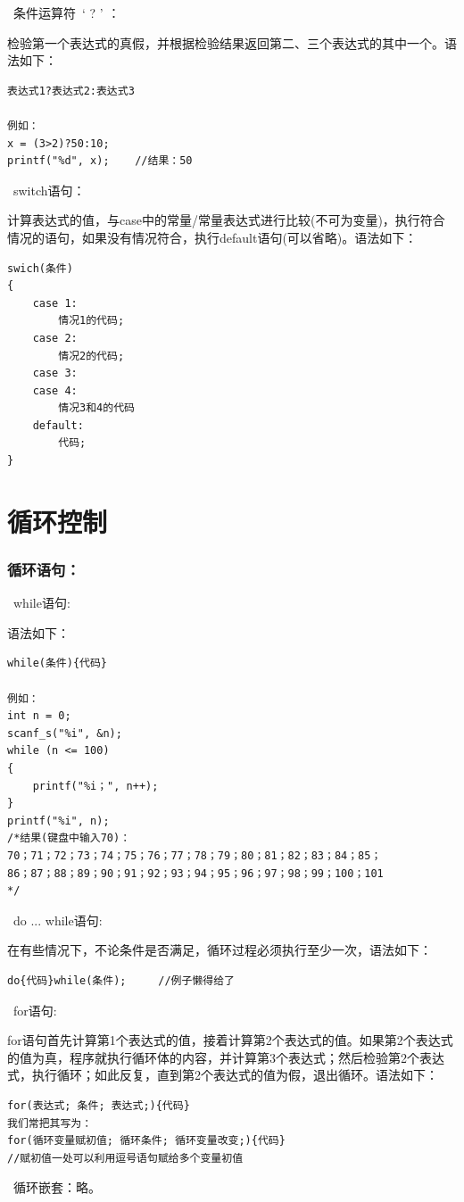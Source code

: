 \documentclass[zihao=-4,UTF8]{report}
\begin{document}
\ 条件运算符\ ` ? '  ：\par
检验第一个表达式的真假，并根据检验结果返回第二、三个表达式的其中一个。语法如下：
\begin{lstlisting}
表达式1?表达式2:表达式3

例如：
x = (3>2)?50:10; 
printf("%d", x);    //结果：50
\end{lstlisting}\par
{}\ switch语句：\par
计算表达式的值，与case中的常量/常量表达式进行比较(不可为变量)，执行符合情况的语句，如果没有情况符合，执行default语句(可以省略)。语法如下：
\begin{lstlisting}
swich(条件)
{
    case 1:
        情况1的代码;
    case 2:
        情况2的代码;
    case 3:
    case 4:
        情况3和4的代码
    default:
        代码;
}
\end{lstlisting}

\section{循环控制}
\subsubsection{循环语句：}
\ while语句:\par
语法如下：
\begin{lstlisting}
while(条件){代码}

例如：
int n = 0;
scanf_s("%i", &n);
while (n <= 100) 
{
    printf("%i；", n++);
}
printf("%i", n);
/*结果(键盘中输入70)：
70；71；72；73；74；75；76；77；78；79；80；81；82；83；84；85；
86；87；88；89；90；91；92；93；94；95；96；97；98；99；100；101
*/
\end{lstlisting}
\ do ... while语句:\par
在有些情况下，不论条件是否满足，循环过程必须执行至少一次，语法如下：
\begin{lstlisting}
do{代码}while(条件);     //例子懒得给了
\end{lstlisting}
\ for语句:\par
for语句首先计算第1个表达式的值，接着计算第2个表达式的值。如果第2个表达式的值为真，程序就执行循环体的内容，并计算第3个表达式；然后检验第2个表达式，执行循环；如此反复，直到第2个表达式的值为假，退出循环。语法如下：
\begin{lstlisting}
for(表达式; 条件; 表达式;){代码}
我们常把其写为：
for(循环变量赋初值; 循环条件; 循环变量改变;){代码} 
//赋初值一处可以利用逗号语句赋给多个变量初值
\end{lstlisting}
\ 循环嵌套：略。
\end{document}
